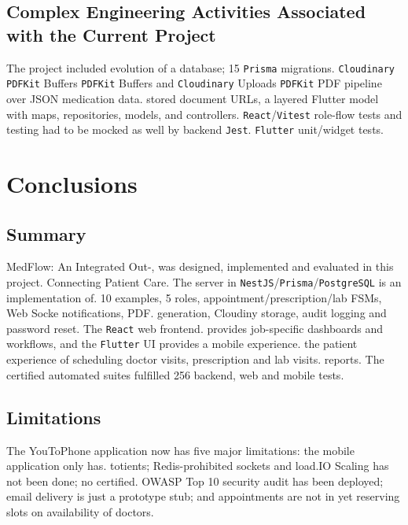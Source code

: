 \documentclass[12pt,a4paper]{report}
\begin{document}
\section{Complex Engineering Activities Associated with the Current Project}

The project included evolution of a database; 15 \texttt{Prisma} migrations.
\texttt{Cloudinary} \texttt{PDFKit} Buffers \texttt{PDFKit} Buffers and \texttt{Cloudinary} Uploads \texttt{PDFKit} PDF pipeline over JSON medication data.
stored document URLs, a layered Flutter model with maps, repositories, models,
and controllers. \texttt{React}/\texttt{Vitest} role-flow tests and testing had to be mocked as well by backend \texttt{Jest}.
\texttt{Flutter} unit/widget tests.

\chapter{Conclusions}
\label{chap:conclusions}

\section{Summary}

MedFlow: An Integrated Out-, was designed, implemented and evaluated in this project.
Connecting Patient Care. The server in \texttt{NestJS}/\texttt{Prisma}/\texttt{PostgreSQL} is an implementation of.
10 examples, 5 roles, appointment/prescription/lab FSMs, Web Socke notifications, PDF.
generation, Cloudiny storage, audit logging and password reset. The \texttt{React} web frontend.
provides job-specific dashboards and workflows, and the \texttt{Flutter} UI provides a mobile experience.
the patient experience of scheduling doctor visits, prescription and lab visits.
reports. The certified automated suites fulfilled 256 backend, web and mobile tests.

\section{Limitations}

The YouToPhone application now has five major limitations: the mobile application only has.
totients; Redis-prohibited sockets and load.IO Scaling has not been done; no certified.
OWASP Top 10 security audit has been deployed; email delivery is just a prototype stub;
and appointments are not in yet reserving slots on availability of doctors.
\end{document}
